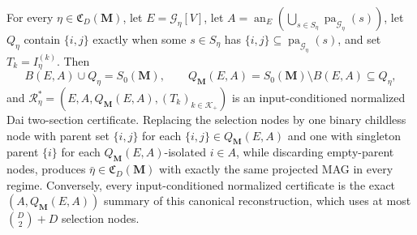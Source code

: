 For every \(\eta\in\mathfrak C_D(\mathbf M)\), let \(E=\mathcal G_\eta[V]\), let \(A=\operatorname{an}_E(\bigcup_{s\in S_\eta}\operatorname{pa}_{\mathcal G_\eta}(s))\), let \(Q_\eta\) contain \(\{i,j\}\) exactly when some \(s\in S_\eta\) has \(\{i,j\}\subseteq\operatorname{pa}_{\mathcal G_\eta}(s)\), and set \(T_k=I_\eta^{(k)}\).  Then
\[
B(E,A)\cup Q_\eta=S_0(\mathbf M),
\qquad
Q_{\mathbf M}(E,A)=S_0(\mathbf M)\setminus B(E,A)\subseteq Q_\eta,
\]
and \(\mathcal R_\eta^*=(E,A,Q_{\mathbf M}(E,A),(T_k)_{k\in\mathcal K_+})\) is an input-conditioned normalized Dai two-section certificate.  Replacing the selection nodes by one binary childless node with parent set \(\{i,j\}\) for each \(\{i,j\}\in Q_{\mathbf M}(E,A)\) and one with singleton parent \(\{i\}\) for each \(Q_{\mathbf M}(E,A)\)-isolated \(i\in A\), while discarding empty-parent nodes, produces \(\bar\eta\in\mathfrak C_D(\mathbf M)\) with exactly the same projected MAG in every regime.  Conversely, every input-conditioned normalized certificate is the exact \((A,Q_{\mathbf M}(E,A))\) summary of this canonical reconstruction, which uses at most \(\binom D2+D\) selection nodes.